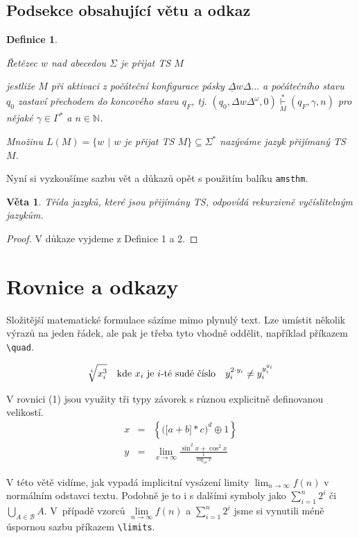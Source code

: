 \documentclass[11pt, twocolumn, a4paper]{article}
\newtheorem{theorem}{Definice}
\newtheorem{sentence}{Věta}
\begin{document}
\subsection{Podsekce obsahující větu a odkaz}

\begin{theorem}
\begin{normalfont}Řetězec $w$ {nad abecedou} $\Sigma$ je přijat TS $M$\end{normalfont}
jestliže $M$ při aktivaci z počáteční konfigurace pásky
$\underline{\Delta} w\Delta...$ a počátečního stavu $q_0$ zastaví přechodem do koncového stavu $q_F$, tj. $(q_0, \Delta w\Delta^\omega, 0) \underset{M}{\overset{*}{\vdash}} (q_F , \gamma,n)$ pro nějaké $\gamma \in \Gamma^\ast$ a $n \in \mathbb{N}$.

Množinu $L(M) = \{w$ $|$ $w$ je přijat TS $M\} \subseteq \Sigma^\ast$ nazý\-váme \emph{jazyk přijímaný TS} $M$.
\end{theorem}
Nyní si vyzkoušíme sazbu vět a důkazů opět s použitím
balíku \texttt{amsthm}.
\begin{sentence}
Třída jazyků, které jsou přijímány TS, odpovídá
\emph{rekurzivně vyčíslitelným jazykům.}
\end{sentence}
\begin{proof}
V důkaze vyjdeme z Definice 1 a 2.
\end{proof}

\section{Rovnice a odkazy}
Složitější matematické formulace sázíme mimo plynulý
text. Lze umístit několik výrazů na jeden řádek, ale pak je
třeba tyto vhodně oddělit, například příkazem \verb|\quad|.


$$\begin{normalfont}\sqrt[i]{x^3_i} \quad \text{kde }x_i \text{ je } i\text{-té sudé číslo}\quad  y_i^{2 \cdot y_i}\neq y_i^{y_i^{y_i}} \end{normalfont}$$

V rovnici (1) jsou využity tři typy závorek s různou
explicitně definovanou velikostí.
\begin{eqnarray}
x &=& \left\{\Big(\big[ a+b\big]*c\Big)^d\oplus 1\right\} \\
y &=& \lim_{x\rightarrow\infty}\frac{\sin^2x + \cos^2x}{\frac{1}{\log_{10}x}} \nonumber
\end{eqnarray}

V této větě vidíme, jak vypadá implicitní vysázení limity
$\lim_{n\rightarrow\infty} f(n)$ v normálním odstavci textu. Podobně je to i s dalšími symboly jako $\sum_{i=1}^n 2^i$ či $\bigcup_{A\in \mathcal{B}} A$.
V~případě vzorců $\lim\limits_{n\rightarrow\infty} f(n)$ a $\sum\limits_{i=1}^n 2^i$ jsme si vynutili méně
úspornou sazbu příkazem \verb|\limits|.
\end{document}
